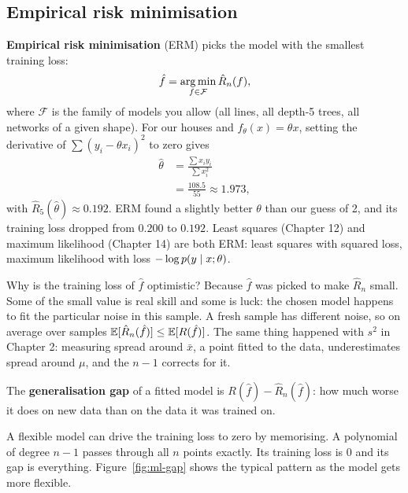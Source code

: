 \subsection{Empirical risk minimisation}

\textbf{Empirical risk minimisation} (ERM) picks the model with the smallest training loss:
\[
\hat f = \operatorname*{arg\,min}_{f\in\mathcal F} \hat R_n(f),
\]
where $\mathcal F$ is the family of models you allow (all lines, all depth-5 trees, all
networks of a given shape). For our houses and $f_\theta(x)=\theta x$, setting the derivative
of $\sum(y_i-\theta x_i)^2$ to zero gives
\begin{align*}
\hat\theta &= \frac{\sum x_iy_i}{\sum x_i^2} \\
&= \frac{108.5}{55} \approx 1.973,
\end{align*}
with $\hat R_5(\hat\theta)\approx 0.192$.
ERM found a slightly better $\theta$ than our guess of 2, and its training loss dropped from
$0.200$ to $0.192$. Least squares (Chapter 12) and maximum likelihood (Chapter 14) are both
ERM: least squares with squared loss, maximum likelihood with loss $-\log p(y\mid x;\theta)$.

\begin{whybox}
Why is the training loss of $\hat f$ optimistic? Because $\hat f$ was picked to make
$\hat R_n$ small. Some of the small value is real skill and some is luck: the chosen model
happens to fit the particular noise in this sample. A fresh sample has different noise, so on
average over samples $\operatorname{\mathbb{E}}[\hat R_n(\hat f)] \le \operatorname{\mathbb{E}}[R(\hat f)]$. The same thing
happened with $s^2$ in Chapter 2: measuring spread around $\bar x$, a point fitted to the
data, underestimates spread around $\mu$, and the $n-1$ corrects for it.
\end{whybox}

\begin{definition}
The \textbf{generalisation gap} of a fitted model is $R(\hat f) - \hat R_n(\hat f)$: how much
worse it does on new data than on the data it was trained on.
\end{definition}

A flexible model can drive the training loss to zero by memorising. A polynomial of degree
$n-1$ passes through all $n$ points exactly. Its training loss is $0$ and its gap is
everything. Figure~\ref{fig:ml-gap} shows the typical pattern as the model gets more
flexible.

